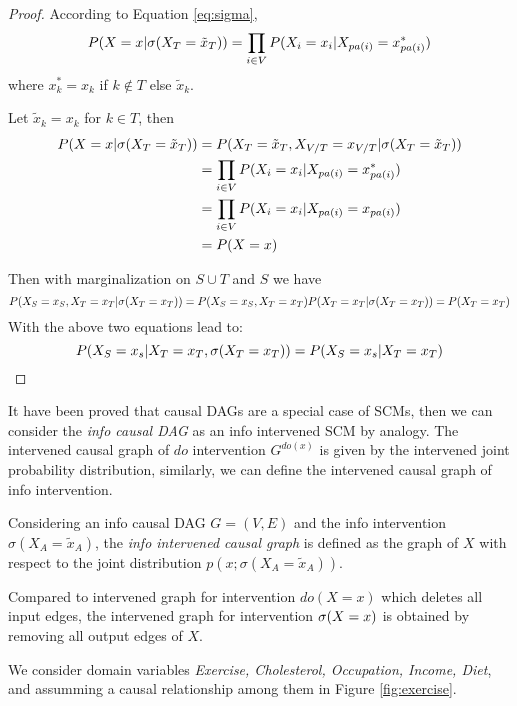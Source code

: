 \begin{proof}
	According to Equation \ref{eq:sigma}, 
	$$
	P(X=x|\mathrm{\sigma}(X_T=\tilde{x}_T)) = \prod_{i\in V} P(X_i = x_i|X_{pa(i)} = x^*_{pa(i)})
	$$
	where $x^*_k = x_k$ if $k \notin T$ else $\tilde{x}_k$.
	
	 Let $\tilde{x}_k = x_k$ for $k \in T$, then 
	\begin{align*}
		P(X=x|\mathrm{\sigma}(X_T=\tilde{x}_T))  &= P(X_T = \tilde{x}_T, X_{V/T} = x_{V/T}| \mathrm{\sigma}(X_T=\tilde{x}_T))  \\
		&=  \prod_{i\in V} P(X_i = x_i|X_{pa(i)} = x^*_{pa(i)}) \\
		&=  \prod_{i\in V} P(X_i = x_i|X_{pa(i)} = x_{pa(i)}) \\
		&= P(X=x) 
	\end{align*}
	
	Then with marginalization on $S \cup T$ and $S$ we have 
	$$
	P(X_S=x_S, X_T = {x}_T|\mathrm{\sigma}(X_T={x}_T)) = P(X_S=x_S, X_T = {x}_T) \\
	P( X_T = {x}_T|\mathrm{\sigma}(X_T={x}_T)) = P(X_T = {x}_T)
	$$ 
   With the above two equations lead to:
    $$P(X_S=x_s|X_T=x_T, \mathrm{\sigma}(X_T=x_T)) = P(X_S=x_s|X_T=x_T)$$
\end{proof}


It have been proved that causal DAGs are a special case of SCMs, then we can consider the \emph{info causal DAG} as an info intervened SCM {{by analogy}}. The intervened causal graph of $do$ intervention $G^{do(x)}$ is given by the intervened joint probability distribution, similarly, we can define the intervened causal graph of info intervention. 

\begin{Def}
	Considering an info causal DAG $G = (V, E)$ and the info intervention $\sigma(X_A = \tilde{x}_A)$, the \emph{info intervened causal graph} is defined as the graph of $X$ with respect to the joint distribution $p(x; \sigma(X_A=\tilde{x}_A))$.
\end{Def}

Compared to intervened graph for intervention $do(X=x)$ which deletes all input edges, the intervened graph for intervention $\mathrm{\sigma}(X=x)$ is obtained by removing all output edges of $X$.



\begin{Eg}
	We consider domain variables \emph{Exercise, Cholesterol, Occupation, Income, Diet}, and assumming a causal relationship among them in Figure \ref{fig:exercise}. 
\end{Eg}




